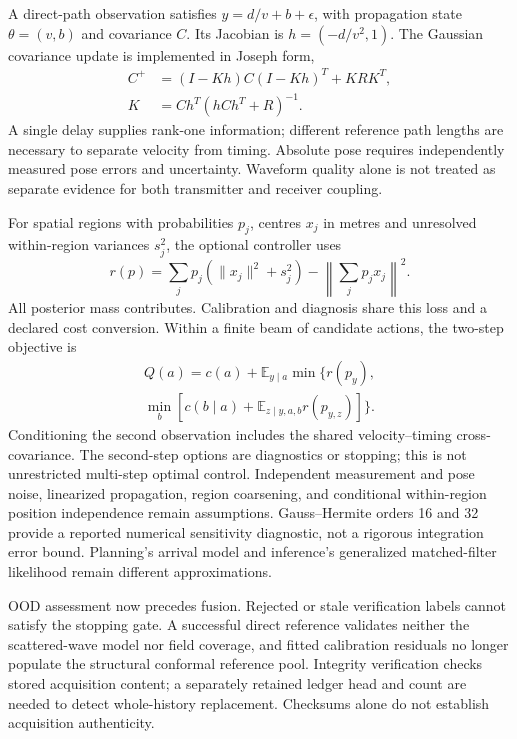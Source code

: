 \documentclass[conference]{IEEEtran}
\newcommand{\E}{\mathbb{E}}
\begin{document}
A direct-path observation satisfies $y=d/v+b+\epsilon$, with propagation state $\theta=(v,b)$ and covariance $C$. Its Jacobian is $h=(-d/v^2,1)$. The Gaussian covariance update is implemented in Joseph form,
\begin{align}
 C^+&=(I-Kh)C(I-Kh)^T+KRK^T,\\
 K&=Ch^T(hCh^T+R)^{-1}.
\end{align}
A single delay supplies rank-one information; different reference path lengths are necessary to separate velocity from timing. Absolute pose requires independently measured pose errors and uncertainty. Waveform quality alone is not treated as separate evidence for both transmitter and receiver coupling.

For spatial regions with probabilities $p_j$, centres $x_j$ in metres and unresolved within-region variances $s_j^2$, the optional controller uses
\begin{equation}
 r(p)=\sum_jp_j(\|x_j\|^2+s_j^2)-\left\|\sum_jp_jx_j\right\|^2.
\end{equation}
All posterior mass contributes. Calibration and diagnosis share this loss and a declared cost conversion. Within a finite beam of candidate actions, the two-step objective is
\begin{equation}
\begin{split}
 Q(a)=c(a)+\E_{y\mid a}\min\big\{r(p_y),\\
 \min_b[c(b\mid a)+\E_{z\mid y,a,b}r(p_{y,z})]\big\}.
\end{split}
\end{equation}
Conditioning the second observation includes the shared velocity--timing cross-covariance. The second-step options are diagnostics or stopping; this is not unrestricted multi-step optimal control. Independent measurement and pose noise, linearized propagation, region coarsening, and conditional within-region position independence remain assumptions. Gauss--Hermite orders 16 and 32 provide a reported numerical sensitivity diagnostic, not a rigorous integration error bound. Planning's arrival model and inference's generalized matched-filter likelihood remain different approximations.

OOD assessment now precedes fusion. Rejected or stale verification labels cannot satisfy the stopping gate. A successful direct reference validates neither the scattered-wave model nor field coverage, and fitted calibration residuals no longer populate the structural conformal reference pool. Integrity verification checks stored acquisition content; a separately retained ledger head and count are needed to detect whole-history replacement. Checksums alone do not establish acquisition authenticity.
\end{document}
